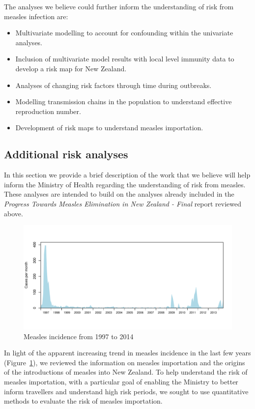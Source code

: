 \documentclass{article}
\begin{document}
The analyses we believe could further inform the understanding of risk from measles infection are:
\begin{itemize}
\item Multivariate modelling to account for confounding within the univariate analyses.
\item Inclusion of multivariate model results with local level immunity data to develop a risk map for New Zealand.
\item Analyses of changing risk factors through time during outbreaks.
\item Modelling transmission chains in the population to understand effective reproduction number.
\item Development of risk maps to understand measles importation.
\end{itemize}

\subsection{Additional risk analyses}
\label{sub:risk_analyses}

In this section we provide a brief description of the work that we believe will help inform the Ministry of Health regarding the understanding of risk from measles. These analyses are intended to build on the analyses already included in the \emph {Progress Towards Measles Elimination in New Zealand - Final} report reviewed above.

\begin{figure}
     \centering
     \includegraphics[width=1\textwidth]{incidence_1997_2014.pdf}
     \caption{Measles incidence from 1997 to 2014}
     \label{fig:incidence1997}
\end{figure}

In light of the apparent increasing trend in measles incidence in the last few years (Figure~\ref{fig:incidence1997}), we reviewed the information on measles importation and the origins of the introductions of measles into New Zealand. To help understand the risk of measles importation, with a particular goal of enabling the Ministry to better inform travellers and understand high risk periods, we sought to use quantitative methods to evaluate the risk of measles importation. 
\end{document}
